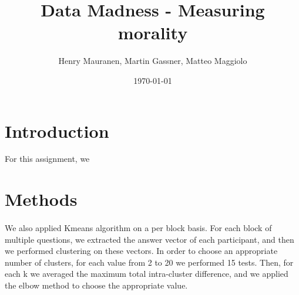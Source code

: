 \documentclass{article}
\title{Data Madness - Measuring morality}
\date{\today}
\author{Henry Mauranen, Martin Gassner, Matteo Maggiolo}
\begin{document}
\maketitle

\section{Introduction}
For this assignment, we 


\section{Methods}

\paragraph{}
We also applied Kmeans algorithm on a per block basis. For each block of multiple questions, we extracted the answer vector of each participant, and then we performed clustering on these vectors. In order to choose an appropriate number of clusters, for each value from 2 to 20 we performed 15 tests. Then, for each k we averaged the maximum total intra-cluster difference, and we applied the elbow method to choose the appropriate value.
\end{document}
